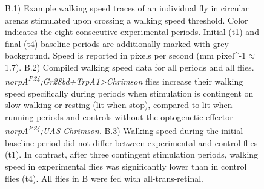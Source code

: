 \documentclass[10pt]{article}
\begin{document}
\begin{figure}[t!]
{	B.1) Example walking speed traces of an individual fly in circular arenas stimulated upon crossing a walking speed threshold. Color indicates the eight consecutive experimental periods. Initial (t1) and final (t4) baseline periods are additionally marked with grey background. Speed is reported in pixels per second (mm pixel^{-1}$\approx$1.7).
	B.2) Compiled walking speed data for all periods and all flies. \textit{norpA\textsuperscript{P24};Gr28bd+TrpA1>Chrimson} flies increase their walking speed specifically during periods when stimulation is contingent on slow walking or resting (lit when stop), compared to lit when running periods and controls without the optogenetic effector \textit{norpA\textsuperscript{P24};UAS-Chrimson}.
	B.3) Walking speed during the initial baseline period did not differ between experimental and control flies (t1). In contrast, after three contingent stimulation periods, walking speed in experimental flies was significantly lower than in control flies (t4). 
	All flies in B were fed with all-trans-retinal.} 
\end{figure}
\end{document}

